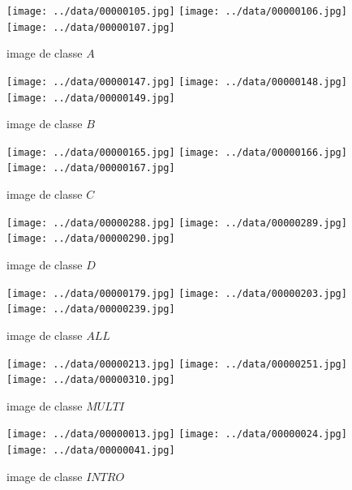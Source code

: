\documentclass{book}
\begin{document}
\begin{figure}[H]
\begin{center}
\texttt{[image: ../data/00000105.jpg]}
\texttt{[image: ../data/00000106.jpg]}
\texttt{[image: ../data/00000107.jpg]}
\end{center}
\caption{image de classe $A$}
\label{classeA}
\end{figure}

\begin{figure}[H]
\begin{center}
\texttt{[image: ../data/00000147.jpg]}
\texttt{[image: ../data/00000148.jpg]}
\texttt{[image: ../data/00000149.jpg]}
\end{center}
\caption{image de classe $B$}
\label{classeB}
\end{figure}

\begin{figure}[H]
\begin{center}
\texttt{[image: ../data/00000165.jpg]}
\texttt{[image: ../data/00000166.jpg]}
\texttt{[image: ../data/00000167.jpg]}
\end{center}
\caption{image de classe $C$}
\label{classeC}
\end{figure}

\begin{figure}[H]
\begin{center}
\texttt{[image: ../data/00000288.jpg]}
\texttt{[image: ../data/00000289.jpg]}
\texttt{[image: ../data/00000290.jpg]}
\end{center}
\caption{image de classe $D$}
\label{classeD}
\end{figure}

\begin{figure}[H]
\begin{center}
\texttt{[image: ../data/00000179.jpg]}
\texttt{[image: ../data/00000203.jpg]}
\texttt{[image: ../data/00000239.jpg]}
\end{center}
\caption{image de classe $ALL$}
\label{classeALL}
\end{figure}

\begin{figure}[H]
\begin{center}
\texttt{[image: ../data/00000213.jpg]}
\texttt{[image: ../data/00000251.jpg]}
\texttt{[image: ../data/00000310.jpg]}
\end{center}
\caption{image de classe $MULTI$}
\label{classeMULTI}
\end{figure}

\begin{figure}[H]
\begin{center}
\texttt{[image: ../data/00000013.jpg]}
\texttt{[image: ../data/00000024.jpg]}
\texttt{[image: ../data/00000041.jpg]}
\end{center}
\caption{image de classe $INTRO$}
\label{classeINTRO}
\end{figure}
\end{document}
